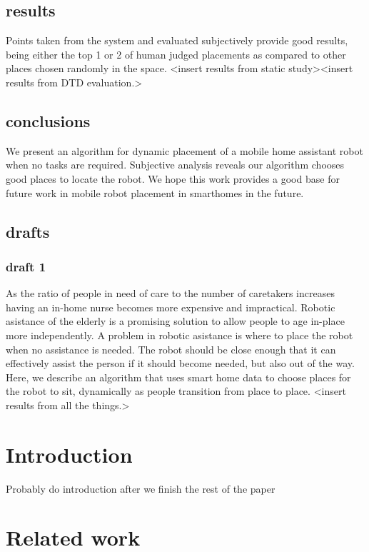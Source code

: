 \documentclass[11pt, conference, a4paper]{IEEEtran}
\begin{document}
\subsection{results}
Points taken from the system and evaluated subjectively provide good results, 
being either the top 1 or 2 of human judged placements as compared to other 
places chosen randomly in the space. \textless insert results from static 
study\textgreater \textless insert results from DTD evaluation.\textgreater

\subsection{conclusions}
We present an algorithm for dynamic placement of a mobile home assistant robot 
when no tasks are required. Subjective analysis reveals our algorithm chooses 
good places to locate the robot. We hope this work provides a good base for 
future work in mobile robot placement in smarthomes in the future.

\subsection{drafts}
\subsubsection{draft 1}
As the ratio of people in need of care to the number of caretakers increases 
having an in-home nurse becomes more expensive and impractical. Robotic 
asistance of the elderly is a promising solution to allow people to age 
in-place more independently. A problem in robotic asistance is where to place 
the robot when no assistance is needed. The robot should be close enough that 
it can effectively assist the person if it should become needed, but also out 
of the way. Here, we describe an algorithm that uses smart home data to choose 
places for the robot to sit, dynamically as people transition from place to 
place. \textless insert results from all the things.\textgreater


\section{Introduction}

Probably do introduction after we finish the rest of the paper

\section{Related work}
\end{document}

